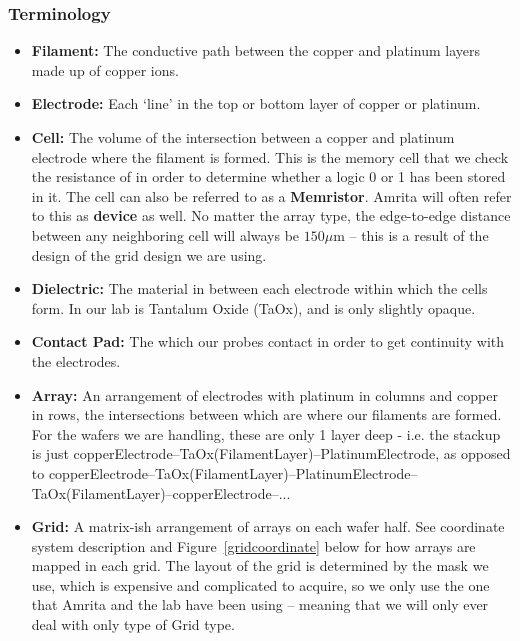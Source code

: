 \documentclass{article}
\begin{document}
        \subsubsection{Terminology} \label{terminology}
          \begin{itemize}
            \item [] \textbf{Filament:} The conductive path between the copper and platinum layers made up of copper
            ions.
            \item [] \textbf{Electrode:} Each `line' in the top or bottom layer of copper or platinum.
            \item [] \textbf{Cell:} The volume of the intersection between a copper and platinum electrode where the
            filament is formed. This is the memory cell that we check the resistance of in order to determine whether a
            logic 0 or 1 has been stored in it. The cell can also be referred to as a \textbf{Memristor}. Amrita will
            often refer to this as \textbf{device} as well. No matter the array type, the edge-to-edge distance between
            any neighboring cell will always be $150\mu$m -- this is a result of the design of the grid design we are
            using. 
            \item [] \textbf{Dielectric:} The material in between each electrode within which the cells form. In our lab
            is Tantalum Oxide (TaOx), and is only slightly opaque.
            \item [] \textbf{Contact Pad:} The which our probes contact in order to get continuity with the electrodes.
            \item [] \textbf{Array:} An arrangement of electrodes with platinum in columns and copper in rows, the
            intersections between which are where our filaments are formed. For the wafers we are handling, these are
            only 1 layer deep - i.e. the stackup is just copperElectrode--TaOx(FilamentLayer)--PlatinumElectrode, as
            opposed to
            copperElectrode--TaOx(FilamentLayer)--PlatinumElectrode--TaOx(FilamentLayer)--copperElectrode--...
            \item [] \textbf{Grid:} A matrix-ish arrangement of arrays on each wafer half. See coordinate system
            description and Figure~\ref{gridcoordinate} below for how arrays are mapped in each grid. The layout of the
            grid is determined by the mask we use, which is expensive and complicated to acquire, so we only use the one
            that Amrita and the lab have been using -- meaning that we will only ever deal with only type of Grid type.

\end{itemize}
\end{document}
